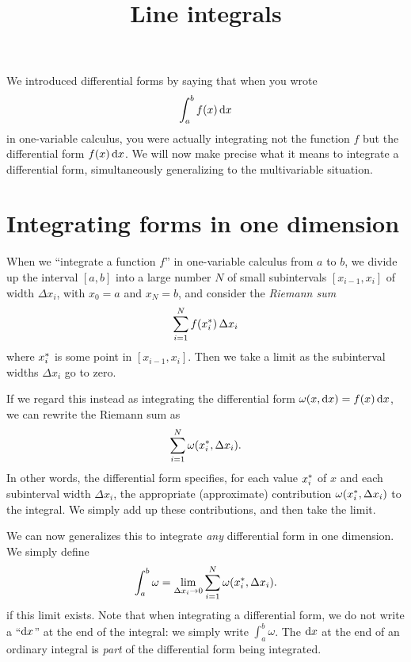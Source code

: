 \documentclass[12pt]{amsart}
\title{Line integrals}
\begin{document}
\maketitle

We introduced differential forms by saying that when you wrote
\[ \int_a^b f(x) \,{\mathrm{d} x} \]
in one-variable calculus, you were actually integrating not the function $f$ but the differential form $f(x)\,{\mathrm{d} x}$.
We will now make precise what it means to integrate a differential form, simultaneously generalizing to the multivariable situation.

\section{Integrating forms in one dimension}
\label{sec:integrating-forms}

When we ``integrate a function $f$'' in one-variable calculus from $a$ to $b$, we divide up the interval $[a,b]$ into a large number $N$ of small subintervals $[x_{i-1},x_i]$ of width $\Delta x_i$, with $x_0 = a$ and $x_N=b$, and consider the \emph{Riemann sum}
\[ \sum_{i=1}^N f({x}_{i}^*)\, \Delta x_i \]
where ${x}_{i}^*$ is some point in $[x_{i-1},x_i]$.
Then we take a limit as the subinterval widths $\Delta x_i$ go to zero.

If we regard this instead as integrating the differential form $\omega(x,{\mathrm{d} x}) = f(x)\, {\mathrm{d} x}$, we can rewrite the Riemann sum as
\[ \sum_{i=1}^N \omega({x}_{i}^*,\Delta x_i). \]
In other words, the differential form specifies, for each value ${x}_{i}^*$ of $x$ and each subinterval width $\Delta x_i$, the appropriate (approximate) contribution $\omega({x}_{i}^*,\Delta x_i)$ to the integral.
We simply add up these contributions, and then take the limit.

We can now generalizes this to integrate \emph{any} differential form in one dimension.
We simply define
\[ \int_a^b \omega = \lim_{\Delta x_i \to 0} \sum_{i=1}^N \omega({x}_{i}^*,\Delta x_i). \]
if this limit exists.
Note that when integrating a differential form, we do not write a ``${\mathrm{d} x}$'' at the end of the integral: we simply write $\int_a^b \omega$.
The ${\mathrm{d} x}$ at the end of an ordinary integral is \emph{part} of the differential form being integrated.
\end{document}
